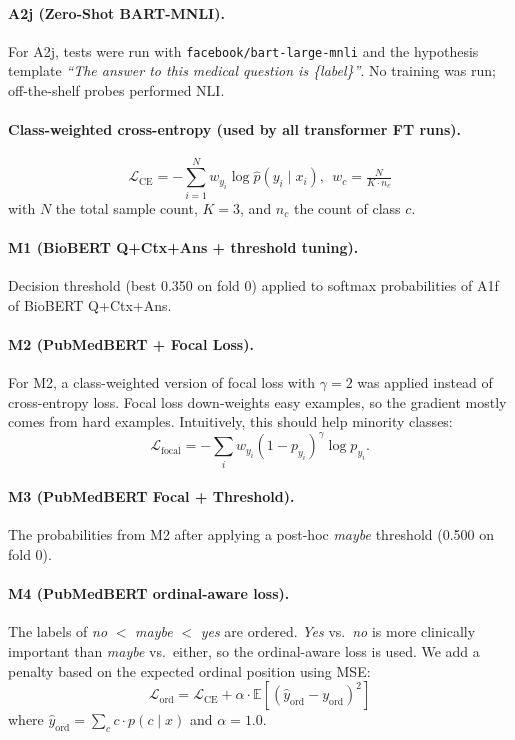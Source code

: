 \documentclass[11pt]{article}
\begin{document}
\paragraph{A2j (Zero-Shot BART-MNLI).} For A2j, tests were run with \texttt{facebook/bart-large-mnli} and the hypothesis template \emph{``The answer to this medical question is \{label\}''}. No training was run; off-the-shelf probes performed NLI.

\paragraph{Class-weighted cross-entropy (used by all transformer FT runs).}
\begin{equation}
\mathcal{L}_{\text{CE}} = -\!\!\sum_{i=1}^{N}\! w_{y_i}\!\log \hat{p}(y_i\!\mid\! x_i),\ \ w_c\!=\!\tfrac{N}{K\cdot n_c}
\label{eq:loss}
\end{equation}
with $N$ the total sample count, $K=3$, and $n_c$ the count of class $c$.

\paragraph{M1 (BioBERT Q+Ctx+Ans + threshold tuning).} Decision threshold (best 0.350 on fold 0) applied to softmax probabilities of A1f of BioBERT Q+Ctx+Ans.

\paragraph{M2 (PubMedBERT + Focal Loss).} For M2, a class-weighted version of focal loss \cite{lin2017focal} with $\gamma = 2$ was applied instead of cross-entropy loss. Focal loss down-weights easy examples, so the gradient mostly comes from hard examples. Intuitively, this should help minority classes:
\begin{equation}
\mathcal{L}_{\text{focal}} = -\!\!\sum_{i}\! w_{y_i}(1-p_{y_i})^{\gamma}\!\log p_{y_i}.
\label{eq:focal}
\end{equation}

\paragraph{M3 (PubMedBERT Focal + Threshold).} The probabilities from M2 after applying a post-hoc \textit{maybe} threshold (0.500 on fold 0).

\paragraph{M4 (PubMedBERT ordinal-aware loss).} The labels of \textit{no} $<$ \textit{maybe} $<$ \textit{yes} are ordered. \textit{Yes} vs.\ \textit{no} is more clinically important than \textit{maybe} vs.\ either, so the ordinal-aware loss is used. We add a penalty based on the expected ordinal position using MSE:
\begin{equation}
\mathcal{L}_{\text{ord}} = \mathcal{L}_{\text{CE}} + \alpha\cdot\mathbb{E}\!\left[(\hat{y}_{\text{ord}} - y_{\text{ord}})^2\right]
\label{eq:ordinal}
\end{equation}
where $\hat{y}_{\text{ord}}=\sum_c c\cdot p(c\mid x)$ and $\alpha=1.0$.
\end{document}
